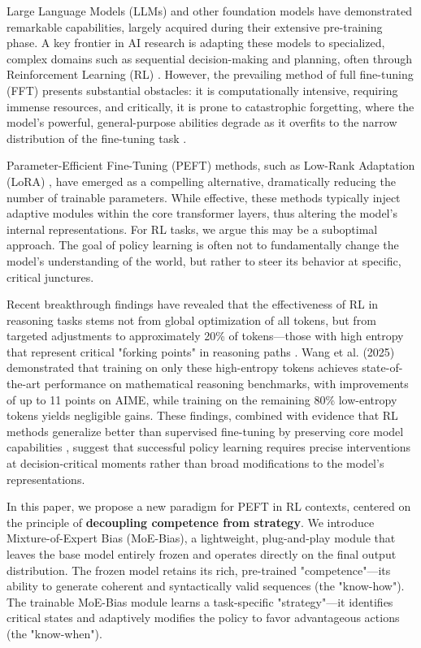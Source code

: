 \documentclass{article}
\begin{document}
Large Language Models (LLMs) and other foundation models have demonstrated remarkable capabilities, largely acquired during their extensive pre-training phase. A key frontier in AI research is adapting these models to specialized, complex domains such as sequential decision-making and planning, often through Reinforcement Learning (RL) \citep{ouyang2022training,bai2022training,rafailov2023direct}. 
However, the prevailing method of full fine-tuning (FFT) presents substantial obstacles: it is computationally intensive, requiring immense resources, and critically, it is prone to catastrophic forgetting, where the model's powerful, general-purpose abilities degrade as it overfits to the narrow distribution of the fine-tuning task \citep{kirkpatrick2017overcoming,luo2023empirical}.

Parameter-Efficient Fine-Tuning (PEFT) methods, such as Low-Rank Adaptation (LoRA) \citep{hu2021lora}, have emerged as a compelling alternative, dramatically reducing the number of trainable parameters. While effective, these methods typically inject adaptive modules within the core transformer layers, thus altering the model's internal representations. For RL tasks, we argue this may be a suboptimal approach. The goal of policy learning is often not to fundamentally change the model's understanding of the world, but rather to steer its behavior at specific, critical junctures.

Recent breakthrough findings have revealed that the effectiveness of RL in reasoning tasks stems not from global optimization of all tokens, but from targeted adjustments to approximately 20\% of tokens—those with high entropy that represent critical "forking points" in reasoning paths \citep{wang2025highentropy}. Wang et al. (2025) demonstrated that training on only these high-entropy tokens achieves state-of-the-art performance on mathematical reasoning benchmarks, with improvements of up to 11 points on AIME, while training on the remaining 80\% low-entropy tokens yields negligible gains. These findings, combined with evidence that RL methods generalize better than supervised fine-tuning by preserving core model capabilities \citep{chu2025sft}, suggest that successful policy learning requires precise interventions at decision-critical moments rather than broad modifications to the model's representations.

In this paper, we propose a new paradigm for PEFT in RL contexts, centered on the principle of \textbf{decoupling competence from strategy}. We introduce Mixture-of-Expert Bias (MoE-Bias), a lightweight, plug-and-play module that leaves the base model entirely frozen and operates directly on the final output distribution. The frozen model retains its rich, pre-trained "competence"—its ability to generate coherent and syntactically valid sequences (the "know-how"). The trainable MoE-Bias module learns a task-specific "strategy"—it identifies critical states and adaptively modifies the policy to favor advantageous actions (the "know-when").
\end{document}
